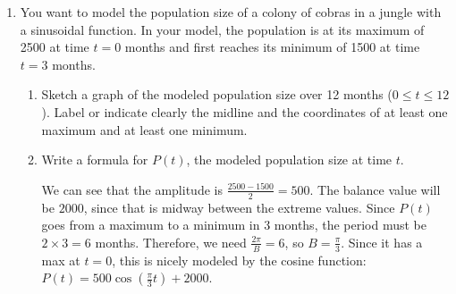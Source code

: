 \documentclass{article}
\begin{document}
\begin{enumerate}
\pspace{\vfill}





\pspace{\newpage}


\item
  \label{spring2010-midterm1-practice-18-modified}

  You want to model the population size of a colony of cobras in a jungle with a sinusoidal
  function. In your model, the population is at its maximum of 2500 at time $t = 0$ months
  and first reaches its minimum of 1500 at time $t = 3$ months.

  \begin{enumerate}
  \item
    \begin{problem}[\vfill]
      Sketch a graph of the modeled population size over 12 months ($0 \leq t
      \leq 12$). Label or indicate clearly the midline and the coordinates of at least one maximum and at least one minimum.
    \end{problem}

    \begin{solution}
      \begin{center}
      \end{center}
    \end{solution}

  \item
    \begin{problem}[\stretch{0.5}]
      Write a formula for $P(t)$, the modeled population size at time $t$. 
    \end{problem}

    \begin{solution}
      We can see that the amplitude is $\frac{2500-1500}{2} = 500$.  The
      balance value will be $2000$, since that is midway between the
      extreme values.  Since $P(t)$ goes from a maximum to a minimum in 3
      months, the period must be $2 \times 3 = 6$ months.  Therefore, we
      need $\frac{2\pi}{B} = 6$, so $B = \frac{\pi}{3}$.  Since it has a
      max at $t=0$, this is nicely modeled by the cosine function: $P(t) =
      \boxed{ 500\cos \left( \frac{\pi}{3}t \right)+2000}$.
    \end{solution}


\end{enumerate}
\end{enumerate}
\end{document}
